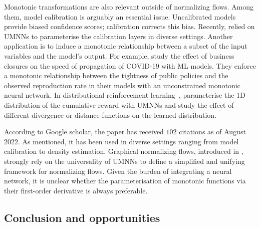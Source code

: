 Monotonic transformations are also relevant outside of normalizing flows. Among them, model calibration is arguably an essential issue. Uncalibrated models provide biased confidence scores; calibration corrects this bias. Recently, \citet{gruber2022trustworthy, deycalibrated, rahimi2020intra} relied on UMNNs to parameterise the calibration layers in diverse settings. Another application is to induce a monotonic relationship between a subset of the input variables and the model's output. For example, \citet{yurk2021county} study the effect of business closures on the speed of propagation of COVID-19 with ML models. They enforce a monotonic relationship between the tightness of public policies and the observed reproduction rate in their models with an unconstrained monotonic neural network. In distributional reinforcement learning~\citep{dabney2018distributional}, \citet{theate2021distributional} parameterise the 1D distribution of the cumulative reward with UMNNs and study the effect of different divergence or distance functions on the learned distribution.

According to Google scholar, the paper has received $102$ citations as of August 2022. As mentioned, it has been used in diverse settings ranging from model calibration to density estimation. Graphical normalizing flows, introduced in , strongly rely on the universality of UMNNs to define a simplified and unifying framework for normalizing flows. Given the burden of integrating a neural network, it is unclear whether the parameterisation of monotonic functions via their first-order derivative is always preferable.



\subsection{Conclusion and opportunities}


